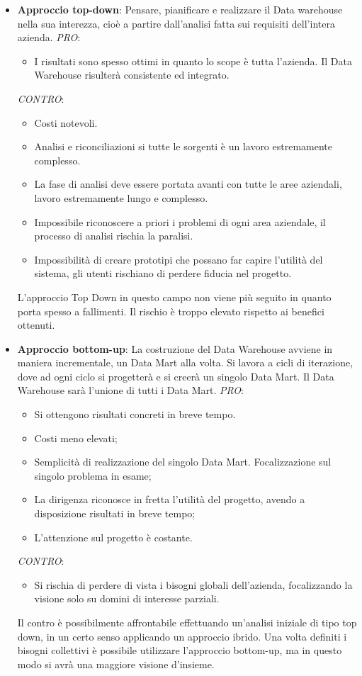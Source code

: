 \begin{itemize}
	\item \textbf{Approccio top-down}: Pensare, pianificare e realizzare il Data warehouse nella sua interezza, cioè a partire dall'analisi fatta sui requisiti dell'intera azienda.\newline\newline
	\textit{PRO}:
	\begin{itemize}
		\item I risultati sono spesso ottimi in quanto lo scope è tutta l'azienda. Il Data Warehouse risulterà consistente ed integrato.
	\end{itemize}
	\textit{CONTRO}:
	\begin{itemize}
		\item Costi notevoli.
		\item Analisi e riconciliazioni si tutte le sorgenti è un lavoro estremamente complesso.
		\item La fase di analisi deve essere portata avanti con tutte le aree aziendali, lavoro estremamente lungo e complesso.
		\item Impossibile riconoscere a priori i problemi di ogni area aziendale, il processo di analisi rischia la paralisi.
		\item Impossibilità di creare prototipi che possano far capire l'utilità del sistema, gli utenti rischiano di perdere fiducia nel progetto.
	\end{itemize}
	L'approccio Top Down in questo campo non viene più seguito in quanto porta spesso a fallimenti. Il rischio è troppo elevato rispetto ai benefici ottenuti.
	\item \textbf{Approccio bottom-up}: La costruzione del Data Warehouse avviene in maniera incrementale, un Data Mart alla volta. Si lavora a cicli di iterazione, dove ad ogni ciclo si progetterà e si creerà un singolo Data Mart. Il Data Warehouse sarà l'unione di tutti i Data Mart.
	\textit{PRO}:
	\begin{itemize}
		\item Si ottengono risultati concreti in breve tempo.
		\item Costi meno elevati;
		\item Semplicità di realizzazione del singolo Data Mart. Focalizzazione sul singolo problema in esame;
		\item La dirigenza riconosce in fretta l'utilità del progetto, avendo a disposizione risultati in breve tempo;
		\item L'attenzione sul progetto è costante.
	\end{itemize}
	\textit{CONTRO}:
	\begin{itemize}
		\item Si rischia di perdere di vista i bisogni globali dell'azienda, focalizzando la visione solo su domini di interesse parziali.
	\end{itemize}
	Il contro è possibilmente affrontabile effettuando un'analisi iniziale di tipo top down, in un certo senso applicando un approccio ibrido. Una volta definiti i bisogni collettivi è possibile utilizzare l'approccio bottom-up, ma in questo modo si avrà una maggiore visione d'insieme.
\end{itemize}

